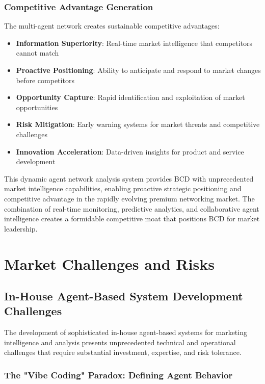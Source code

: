 \subsubsection{Competitive Advantage Generation}

The multi-agent network creates sustainable competitive advantages:

\begin{itemize}
    \item \textbf{Information Superiority}: Real-time market intelligence that competitors cannot match
    \item \textbf{Proactive Positioning}: Ability to anticipate and respond to market changes before competitors
    \item \textbf{Opportunity Capture}: Rapid identification and exploitation of market opportunities
    \item \textbf{Risk Mitigation}: Early warning systems for market threats and competitive challenges
    \item \textbf{Innovation Acceleration}: Data-driven insights for product and service development
\end{itemize}

This dynamic agent network analysis system provides BCD with unprecedented market intelligence capabilities, enabling proactive strategic positioning and competitive advantage in the rapidly evolving premium networking market. The combination of real-time monitoring, predictive analytics, and collaborative agent intelligence creates a formidable competitive moat that positions BCD for market leadership.

\section{Market Challenges and Risks}

\subsection{In-House Agent-Based System Development Challenges}

The development of sophisticated in-house agent-based systems for marketing intelligence and analysis presents unprecedented technical and operational challenges that require substantial investment, expertise, and risk tolerance.

\subsubsection{The "Vibe Coding" Paradox: Defining Agent Behavior}

